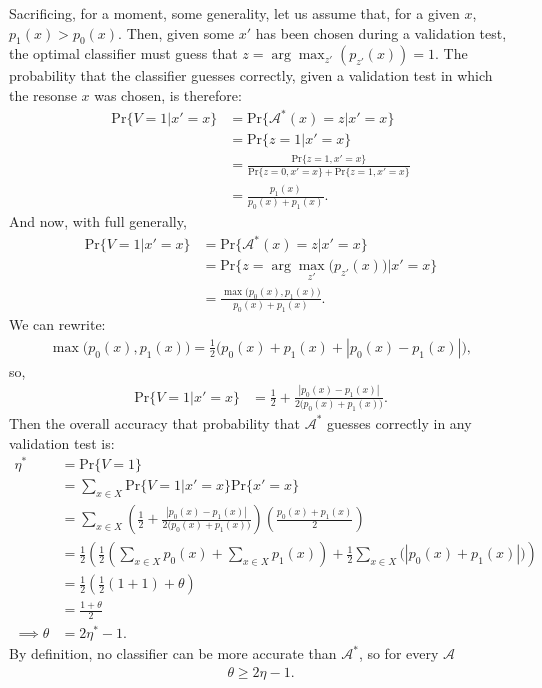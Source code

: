 \documentclass[12pt]{article}
\begin{document}
Sacrificing, for a moment, some generality, let us assume that, for a given 
$x$, $p_1(x) > p_0(x)$.  
Then, given some $x'$ has been chosen during a 
validation test, the optimal classifier must guess that 
$z = \arg\!\max_{z'}(p_{z'}(x)) = 1$.
The probability that the classifier guesses correctly, given a validation
test in which the resonse $x$ was chosen, is therefore:
\begin{align}
	\mathrm{Pr}\{V = 1 | x' = x \} 
		&= \mathrm{Pr}\{\mathcal{A^*}(x) = z | x' = x \} \\
		&= \mathrm{Pr}\{z = 1 | x' = x \}  \\
		&= \frac{\mathrm{Pr}\{z = 1 , x' = x\}}
			{ \mathrm{Pr}\{z=0 , x'=x\} + \mathrm{Pr}\{z=1 , x'=x\}} \\
		&= \frac{p_1(x)}{p_0(x) + p_1(x)}.
\end{align}
And now, with full generally,
\begin{align}
	\mathrm{Pr}\{V=1 | x' = x \} 
		&= \mathrm{Pr}\{\mathcal{A^*}(x) = z | x' = x \} \\
		&= \mathrm{Pr}\{z = \arg\!\max_{z'}\big(p_{z'}(x)\big)| x' = x \}  \\
		&= \frac{\max\big( p_0(x),p_1(x) \big)}
		{ p_0(x) + p_1(x) }.
\end{align}
We can rewrite:
\begin{align}
	\max\big(p_0(x),p_1(x)\big) = \frac{1}{2}
		\big(
			p_0(x) + p_1(x) + |p_0(x) - p_1(x)|
		\big),
\end{align}
so,
\begin{align}
	\mathrm{Pr}\{V = 1 | x' = x \} 
	&= \frac{1}{2} + \frac{|p_0(x) - p_1(x)|}{2 \big(p_0(x) + p_1(x) \big)}.
\end{align}
Then the overall accuracy that probability that $\mathcal{A^*}$ guesses correctly in 
any validation test is:
\begin{align}
	\eta^* &= \mathrm{Pr}\{V=1\} \\
		&=\sum_{x\in X} \mathrm{Pr}\{V = 1 | x' = x \} \mathrm{Pr}\{x' = x\}\\
		&= \sum_{x\in X} \left(
				\frac{1}{2} + 
				\frac{|p_0(x) - p_1(x)|}{2 \big(p_0(x) + p_1(x) \big)}
			\right)
			\left(
				\frac{p_0(x) + p_1(x)}{2}
			\right)\\
		&= \frac{1}{2}\left(
				\frac{1}{2}(
					\sum_{x \in X}p_0(x) + \sum_{x \in X}p_1(x)
				) + 
				\frac{1}{2} \sum_{x \in X} \big(|p_0(x) + p_1(x)|\big)
			\right) \\
		&= \frac{1}{2} \left( \frac{1}{2}(1 + 1) + \theta \right)\\
		&= \frac{1 + \theta}{2}\\
		\implies \theta &= 2\eta^* - 1.
\end{align}
By definition, no classifier can be more accurate than $\mathcal{A^*}$, so
for every $\mathcal{A}$
\begin{align}
		\theta \geq 2\eta - 1.
\end{align}
\end{document}
